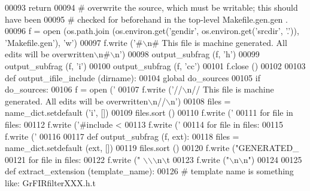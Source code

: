 \begin{DoxyCode}
00093         \textcolor{keywordflow}{return}
00094 \textcolor{comment}{# overwrite the source, which must be writable; this should have been}
00095 \textcolor{comment}{# checked for beforehand in the top-level Makefile.gen.gen .}
00096     f = open (os.path.join (os.environ.get(\textcolor{stringliteral}{'gendir'}, os.environ.get(\textcolor{stringliteral}{'srcdir'}, \textcolor{stringliteral}{'.'})), \textcolor{stringliteral}{'Makefile.gen'}), \textcolor{stringliteral}{'w'})
00097     f.write (\textcolor{stringliteral}{'#\(\backslash\)n# This file is machine generated.  All edits will be overwritten\(\backslash\)n#\(\backslash\)n'})
00098     output\_subfrag (f, \textcolor{stringliteral}{'h'})
00099     output\_subfrag (f, \textcolor{stringliteral}{'i'})
00100     output\_subfrag (f, \textcolor{stringliteral}{'cc'})
00101     f.close ()
00102 
00103 \textcolor{keyword}{def }output_ifile_include (dirname):
00104     \textcolor{keyword}{global} do\_sources
00105     \textcolor{keywordflow}{if} do\_sources:
00106         f = open (\textcolor{stringliteral}{'%
00107         f.write (\textcolor{stringliteral}{'//\(\backslash\)n// This file is machine generated.  All edits will be overwritten\(\backslash\)n//\(\backslash\)n'})
00108         files = name\_dict.setdefault (\textcolor{stringliteral}{'i'}, [])
00109         files.sort ()
00110         f.write (\textcolor{stringliteral}{'%
00111         \textcolor{keywordflow}{for} file \textcolor{keywordflow}{in} files:
00112             f.write (\textcolor{stringliteral}{'#include <%
00113         f.write (\textcolor{stringliteral}{'%
00114         \textcolor{keywordflow}{for} file \textcolor{keywordflow}{in} files:
00115             f.write (\textcolor{stringliteral}{'%
00116 
00117 \textcolor{keyword}{def }output_subfrag (f, ext):
00118     files = name\_dict.setdefault (ext, [])
00119     files.sort ()
00120     f.write (\textcolor{stringliteral}{"GENERATED\_%
00121     \textcolor{keywordflow}{for} file \textcolor{keywordflow}{in} files:
00122         f.write (\textcolor{stringliteral}{" \(\backslash\)\(\backslash\)\(\backslash\)n\(\backslash\)t%
00123     f.write (\textcolor{stringliteral}{"\(\backslash\)n\(\backslash\)n"})
00124 
00125 \textcolor{keyword}{def }extract_extension (template\_name):
00126     \textcolor{comment}{# template name is something like: GrFIRfilterXXX.h.t}
}}}}}}}
\end{DoxyCode}
